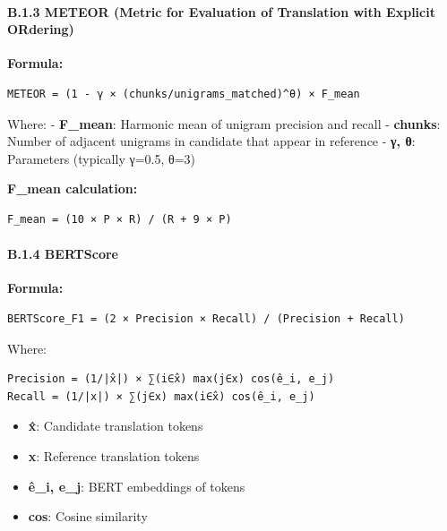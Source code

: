 \documentclass[12pt,a4paper]{article}
\providecommand{\tightlist}{%
  \setlength{\itemsep}{0pt}\setlength{\parskip}{0pt}}
\begin{document}
{{{{{\hypertarget{b.1.3-meteor-metric-for-evaluation-of-translation-with-explicit-ordering}{%
\paragraph{B.1.3 METEOR (Metric for Evaluation of Translation with
Explicit
ORdering)}\label{b.1.3-meteor-metric-for-evaluation-of-translation-with-explicit-ordering}}

\textbf{Formula:}

\begin{verbatim}
METEOR = (1 - γ × (chunks/unigrams_matched)^θ) × F_mean
\end{verbatim}

Where: - \textbf{F\_mean}: Harmonic mean of unigram precision and recall
- \textbf{chunks}: Number of adjacent unigrams in candidate that appear
in reference - \textbf{γ, θ}: Parameters (typically γ=0.5, θ=3)

\textbf{F\_mean calculation:}

\begin{verbatim}
F_mean = (10 × P × R) / (R + 9 × P)
\end{verbatim}

\hypertarget{b.1.4-bertscore}{%
\paragraph{B.1.4 BERTScore}\label{b.1.4-bertscore}}

\textbf{Formula:}

\begin{verbatim}
BERTScore_F1 = (2 × Precision × Recall) / (Precision + Recall)
\end{verbatim}

Where:

\begin{verbatim}
Precision = (1/|x̂|) × ∑(i∈x̂) max(j∈x) cos(ê_i, e_j)
Recall = (1/|x|) × ∑(j∈x) max(i∈x̂) cos(ê_i, e_j)
\end{verbatim}

\begin{itemize}
\tightlist
\item
  \textbf{x̂}: Candidate translation tokens
\item
  \textbf{x}: Reference translation tokens
\item
  \textbf{ê\_i, e\_j}: BERT embeddings of tokens
\item
  \textbf{cos}: Cosine similarity
\end{itemize}

}}}}}
\end{document}
